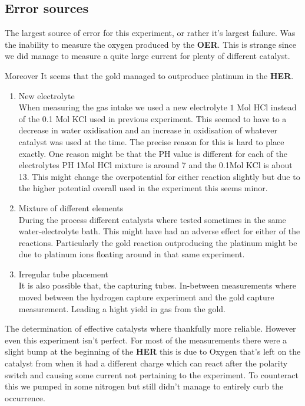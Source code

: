 \documentclass[twocolumn]{revtex4-2}
\begin{document}
\subsection{Error sources}
The largest source of error for this experiment, or rather it's largest failure. Was 
the inability to measure the oxygen produced by the \textbf{OER}. This is strange 
since we did manage to measure a quite large current for plenty of different catalyst.
\par
Moreover It seems that the gold managed to outproduce platinum in the \textbf{HER}.
\begin{enumerate}
	\item New electrolyte \\
		When measuring the gas intake we used a new electrolyte $1$ Mol HCl instead of the
		0.1 Mol KCl used in previous experiment. This seemed to have to a decrease in water oxidisation
		and an increase in oxidisation of whatever catalyst was used at the time. The precise
		reason for this is hard to place exactly. One reason might be that the PH value is 
		different for each of the electrolytes PH 1Mol HCl mixture is around 7 and the 0.1Mol KCl
		is about 13. This might change the overpotential for either reaction slightly but due 
		to the higher potential overall used in the experiment this seems minor.
	\item Mixture of different elements \\
		During the process different catalysts where tested sometimes in the same 
		water-electrolyte bath. This might have had an adverse effect for either of 
		the reactions. Particularly the gold reaction outproducing the platinum might
		be due to platinum ions floating around in that same experiment.
	\item Irregular tube placement\\
		It is also possible that, the capturing tubes. In-between measurements where moved
		between the hydrogen capture experiment and the gold capture measurement. Leading 
		a hight yield in gas from the gold.
\end{enumerate}

The determination of effective catalysts where thankfully more reliable. However even this experiment
isn't perfect. 
For most of the measurements there were a slight bump at the beginning of the \textbf{HER} this is due to
Oxygen that's left on the catalyst from when it had a different charge which can react after the polarity
switch and causing some current not pertaining to the experiment. To counteract this we pumped in some 
nitrogen but still didn't manage to entirely curb the occurrence.
\end{document}
